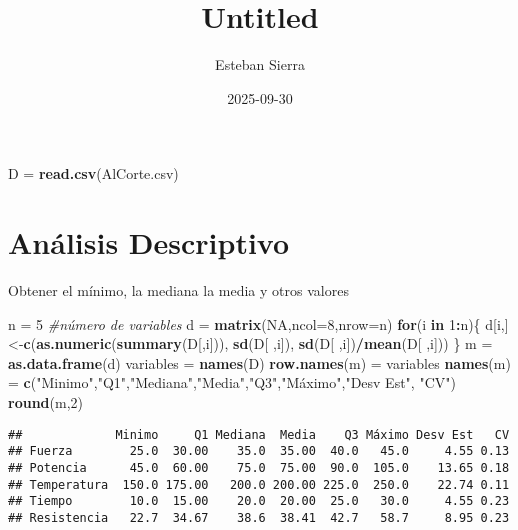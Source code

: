 \documentclass[
]{article}
\title{Untitled}
\author{Esteban Sierra}
\date{2025-09-30}
\newenvironment{Shaded}{\begin{snugshade}}{\end{snugshade}}
\newcommand{\AttributeTok}[1]{\textcolor[rgb]{0.13,0.29,0.53}{#1}}
\newcommand{\CommentTok}[1]{\textcolor[rgb]{0.56,0.35,0.01}{\textit{#1}}}
\newcommand{\ConstantTok}[1]{\textcolor[rgb]{0.56,0.35,0.01}{#1}}
\newcommand{\ControlFlowTok}[1]{\textcolor[rgb]{0.13,0.29,0.53}{\textbf{#1}}}
\newcommand{\DecValTok}[1]{\textcolor[rgb]{0.00,0.00,0.81}{#1}}
\newcommand{\FunctionTok}[1]{\textcolor[rgb]{0.13,0.29,0.53}{\textbf{#1}}}
\newcommand{\NormalTok}[1]{#1}
\newcommand{\OtherTok}[1]{\textcolor[rgb]{0.56,0.35,0.01}{#1}}
\newcommand{\SpecialCharTok}[1]{\textcolor[rgb]{0.81,0.36,0.00}{\textbf{#1}}}
\newcommand{\StringTok}[1]{\textcolor[rgb]{0.31,0.60,0.02}{#1}}
\begin{document}
\maketitle

\begin{Shaded}
\begin{Highlighting}[]
\NormalTok{D }\OtherTok{=} \FunctionTok{read.csv}\NormalTok{(}\StringTok{\textquotesingle{}AlCorte.csv\textquotesingle{}}\NormalTok{)}
\end{Highlighting}
\end{Shaded}

\section{Análisis Descriptivo}\label{anuxe1lisis-descriptivo}

Obtener el mínimo, la mediana la media y otros valores

\begin{Shaded}
\begin{Highlighting}[]
\NormalTok{n }\OtherTok{=} \DecValTok{5} \CommentTok{\#número de variables}
\NormalTok{d }\OtherTok{=} \FunctionTok{matrix}\NormalTok{(}\ConstantTok{NA}\NormalTok{,}\AttributeTok{ncol=}\DecValTok{8}\NormalTok{,}\AttributeTok{nrow=}\NormalTok{n)}
\ControlFlowTok{for}\NormalTok{(i }\ControlFlowTok{in} \DecValTok{1}\SpecialCharTok{:}\NormalTok{n)\{}
\NormalTok{  d[i,]}\OtherTok{\textless{}{-}}\FunctionTok{c}\NormalTok{(}\FunctionTok{as.numeric}\NormalTok{(}\FunctionTok{summary}\NormalTok{(D[,i])), }\FunctionTok{sd}\NormalTok{(D[ ,i]), }\FunctionTok{sd}\NormalTok{(D[ ,i])}\SpecialCharTok{/}\FunctionTok{mean}\NormalTok{(D[ ,i]))}
\NormalTok{\}}
\NormalTok{m }\OtherTok{=} \FunctionTok{as.data.frame}\NormalTok{(d)}
\NormalTok{variables }\OtherTok{=} \FunctionTok{names}\NormalTok{(D)}
\FunctionTok{row.names}\NormalTok{(m) }\OtherTok{=}\NormalTok{ variables}
\FunctionTok{names}\NormalTok{(m) }\OtherTok{=} \FunctionTok{c}\NormalTok{(}\StringTok{"Minimo"}\NormalTok{,}\StringTok{"Q1"}\NormalTok{,}\StringTok{"Mediana"}\NormalTok{,}\StringTok{"Media"}\NormalTok{,}\StringTok{"Q3"}\NormalTok{,}\StringTok{"Máximo"}\NormalTok{,}\StringTok{"Desv Est"}\NormalTok{, }\StringTok{"CV"}\NormalTok{)}
\FunctionTok{round}\NormalTok{(m,}\DecValTok{2}\NormalTok{)}
\end{Highlighting}
\end{Shaded}

\begin{verbatim}
##             Minimo     Q1 Mediana  Media    Q3 Máximo Desv Est   CV
## Fuerza        25.0  30.00    35.0  35.00  40.0   45.0     4.55 0.13
## Potencia      45.0  60.00    75.0  75.00  90.0  105.0    13.65 0.18
## Temperatura  150.0 175.00   200.0 200.00 225.0  250.0    22.74 0.11
## Tiempo        10.0  15.00    20.0  20.00  25.0   30.0     4.55 0.23
## Resistencia   22.7  34.67    38.6  38.41  42.7   58.7     8.95 0.23
\end{verbatim}
\end{document}
